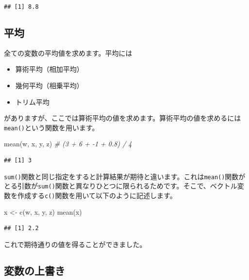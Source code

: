 \documentclass[
  12pt,
]{book}
\newenvironment{Shaded}{\begin{snugshade}}{\end{snugshade}}
\newcommand{\CommentTok}[1]{\textcolor[rgb]{0.56,0.35,0.01}{\textit{#1}}}
\newcommand{\FunctionTok}[1]{\textcolor[rgb]{0.00,0.00,0.00}{#1}}
\newcommand{\NormalTok}[1]{#1}
\newcommand{\OtherTok}[1]{\textcolor[rgb]{0.56,0.35,0.01}{#1}}
\providecommand{\tightlist}{%
  \setlength{\itemsep}{0pt}\setlength{\parskip}{0pt}}
\begin{document}
\begin{verbatim}
## [1] 8.8
\end{verbatim}

\hypertarget{ux5e73ux5747-1}{%
\subsection{平均}\label{ux5e73ux5747-1}}

全ての変数の平均値を求めます。平均には

\begin{itemize}
\tightlist
\item
  算術平均（相加平均）
\item
  幾何平均（相乗平均）
\item
  トリム平均
\end{itemize}

がありますが、ここでは算術平均の値を求めます。算術平均の値を求めるには\texttt{mean()}という関数を用います。

\begin{Shaded}
\begin{Highlighting}[]
\FunctionTok{mean}\NormalTok{(w, x, y, z)   }\CommentTok{\# (3 + 6 + {-}1 + 0.8) / 4}
\end{Highlighting}
\end{Shaded}

\begin{verbatim}
## [1] 3
\end{verbatim}

\texttt{sum()}関数と同じ指定をすると計算結果が期待と違います。これは\texttt{mean()}関数がとる引数が\texttt{sum()}関数と異なりひとつに限られるためです。そこで、ベクトル変数を作成する\texttt{c()}関数を用いて以下のように記述します。

\begin{Shaded}
\begin{Highlighting}[]
\NormalTok{x }\OtherTok{\textless{}{-}} \FunctionTok{c}\NormalTok{(w, x, y, z)}
\FunctionTok{mean}\NormalTok{(x)}
\end{Highlighting}
\end{Shaded}

\begin{verbatim}
## [1] 2.2
\end{verbatim}

これで期待通りの値を得ることができました。

\hypertarget{ux5909ux6570ux306eux4e0aux66f8ux304d}{%
\subsection{変数の上書き}\label{ux5909ux6570ux306eux4e0aux66f8ux304d}}
\end{document}
